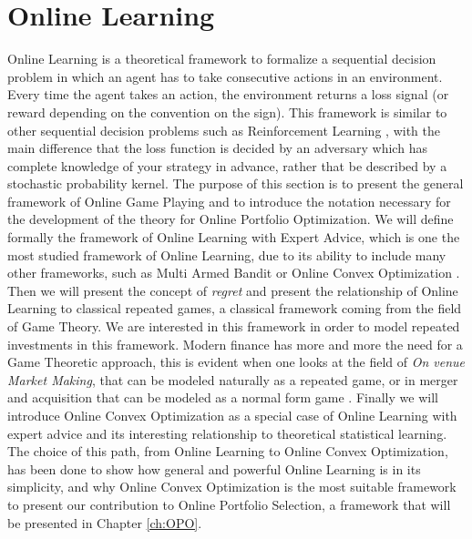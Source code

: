 \chapter{Online Learning}\label{ch:OnlineLearning}
Online Learning is a theoretical framework to formalize a sequential decision problem in which an agent has to take consecutive actions in an environment. Every time the agent takes an action, the environment returns a loss signal (or reward depending on the convention on the sign). This framework is similar to other sequential decision problems such as Reinforcement Learning \cite{sutton1998introduction}, with the main difference that the loss function is decided by an adversary which has complete knowledge of your strategy in advance, rather that be described by a stochastic probability kernel. 
The purpose of this section is to present the general framework of Online Game Playing and to introduce the notation necessary for the development of the theory for Online Portfolio Optimization. We will define formally the framework of Online Learning with Expert Advice, which is one the most studied framework of Online Learning, due to its ability to include many other frameworks, such as Multi Armed Bandit \cite{bubeck2012regret} or Online Convex Optimization \cite{hazan2016introduction}.
Then we will present the concept of \emph{regret} and present the relationship of Online Learning to classical repeated games, a classical framework coming from the field of Game Theory. 
We are interested in this framework in order to model repeated investments in this framework. 
Modern finance  has more and more the need for a Game Theoretic approach, this is evident when one looks at the field of \emph{On venue Market Making}, that can be modeled naturally as a repeated game, or in merger and acquisition that can be modeled as a normal form game \cite{Yanqing_MaA}. 
Finally we will introduce Online Convex Optimization as a special case of Online Learning with expert advice and its interesting relationship to theoretical statistical learning. The choice of this path, from Online Learning to Online Convex Optimization, has been done to show how general and powerful Online Learning is in its simplicity, and why Online Convex Optimization is the most suitable framework to present our contribution to Online Portfolio Selection, a framework that will be presented in Chapter \ref{ch:OPO}.

